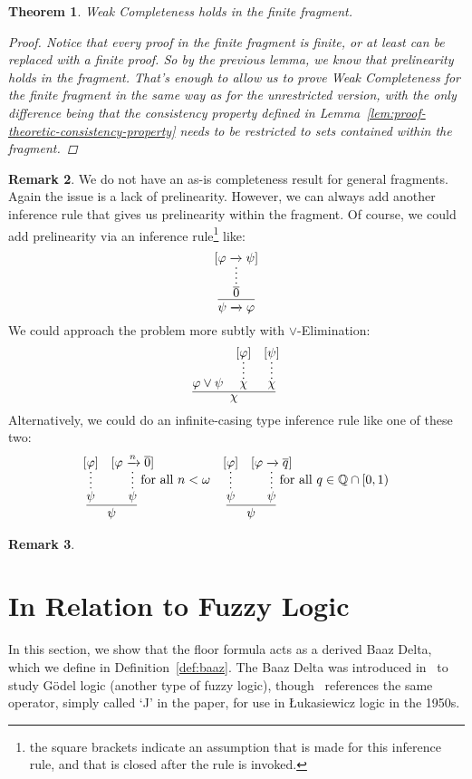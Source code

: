 \documentclass{amsart}
\newtheorem{theorem}{Theorem}[section]
\theoremstyle{definition}
\newtheorem{remark}[theorem]{Remark}
\numberwithin{equation}{theorem}
\renewcommand{\phi}{\varphi}
\newcommand{\Q}{\mathbb{Q}}
\newcommand{\unvee}{{\vee}}
\newcommand{\rat}[1]{{\overline{#1}}}
\newcommand{\narrow}[1]{\xrightarrow{#1}}
\renewcommand{\to}{\narrow{}}
\begin{document}
\begin{theorem}
  Weak Completeness holds in the finite fragment.
  \begin{proof}
    Notice that every proof in the finite fragment is finite, or at least can be replaced with a finite proof.
    So by the previous lemma, we know that prelinearity holds in the fragment.
    That's enough to allow us to prove Weak Completeness for the finite fragment in the same way as for the unrestricted version, with the only difference being that the consistency property defined in Lemma~\ref{lem:proof-theoretic-consistency-property} needs to be restricted to sets contained within the fragment.
  \end{proof}
\end{theorem}

\begin{remark}
  We do not have an as-is completeness result for general fragments.
  Again the issue is a lack of prelinearity.
  However, we can always add another inference rule that gives us prelinearity within the fragment.
  Of course, we could add prelinearity via an inference rule\footnote{the square brackets indicate an assumption that is made for this inference rule, and that is closed after the rule is invoked.} like:
  \[
    \infer{\psi\to\phi}{
      \infer*{\rat 0}{[\phi\to\psi]}
    }
  \]
  We could approach the problem more subtly with $\unvee$-Elimination:
  \[
    \infer{\chi}{
      \phi\vee\psi &
      \infer*{\chi}{[\phi]} &
      \infer*{\chi}{[\psi]}
    }
  \]
  Alternatively, we could do an infinite-casing type inference rule like one of these two:
  \begin{align*}
    \infer{\psi}{
      \infer*{\psi}{[\phi]} &
      \infer*[\text{for all $n<\omega$}]{\psi}{[\phi\narrow{n}\rat 0]}
    } &&
    \infer{\psi}{
      \infer*{\psi}{[\phi]} &
      \infer*[\text{for all $q\in\Q\cap[0,1)$}]{\psi}{[\phi\to\rat q]}
    }
  \end{align*}
\end{remark}
\begin{remark}
  
\end{remark}
\section{In Relation to Fuzzy Logic}
In this section, we show that the floor formula acts as a derived Baaz Delta, which we define in Definition~\ref{def:baaz}.
The Baaz Delta was introduced in~\cite{baaz1996infinite} to study G\"odel logic (another type of fuzzy logic), though~\cite{rose1958fragments} references the same operator, simply called `J' in the paper, for use in {\L}ukasiewicz logic in the 1950s.
\end{document}
